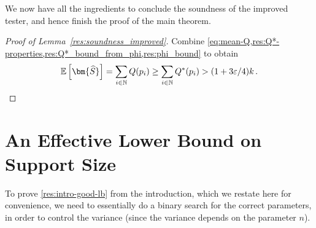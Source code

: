 \documentclass{theoretics}
\newcommand{\Ex}[1]{\bE \left[ #1 \right]}
\newcommand{\bE}{\ensuremath{\mathbb{E}}}
\newcommand{\bN}{\ensuremath{\mathbb{N}}}
\renewcommand{\epsilon}{\varepsilon}
\begin{document}
We now have all the ingredients to conclude the soundness of the improved tester, and hence finish
the proof of the main theorem.

\begin{proof}[Proof of Lemma~\ref{res:soundness_improved}]
    Combine \cref{eq:mean-Q,res:Q*-properties,res:Q*_bound_from_phi,res:phi_bound} to obtain
    \[
        \Ex{\bm{\widehat S}}
        = \sum_{i \in \bN} Q(p_i)
        \ge \sum_{i \in \bN} Q^*(p_i)
        > (1 + 3\epsilon/4) k \,. \qedhere
    \]
\end{proof}

\section{An Effective Lower Bound on Support Size}
\label{section:good-lower-bound}

To prove \cref{res:intro-good-lb} from the introduction, which we restate here for convenience,
we need to essentially do a binary search for the correct parameters, in order to control the
variance (since the variance depends on the parameter $n$).
\end{document}

